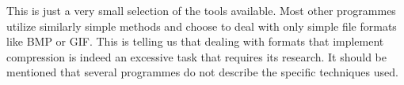 This is just a very small selection of the tools available. Most other programmes utilize similarly simple methods and choose to deal with only simple file formats like BMP or GIF. This is telling us that dealing with formats that implement compression is indeed an excessive task that requires its research. 
It should be mentioned that several programmes do not describe the specific techniques used.